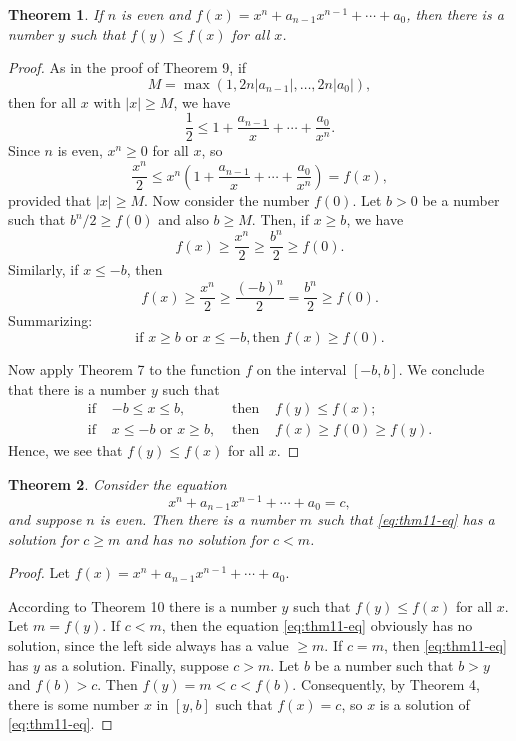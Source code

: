 \documentclass{article}
\numberwithin{definition}{subsection}
\numberwithin{lemma}{subsection}
\newtheorem{theorem}{Theorem}
\numberwithin{theorem}{subsection}
\begin{document}
\begin{theorem}
  If $n$ is even and $f(x) = x^n + a_{n-1}x^{n-1} + \cdots + a_0$, then there
  is a number $y$ such that $f(y) \leq f(x)$ for all $x$.
\end{theorem}
\begin{proof}
  As in the proof of Theorem 9, if \[
    M = \max(1, 2n|a_{n-1}|, \ldots, 2n|a_0|),
  \] then for all $x$ with $|x| \geq M$, we have \[
    \frac{1}{2} \leq 1 + \frac{a_{n-1}}{x} + \cdots + \frac{a_0}{x^n}.
    \] Since $n$ is even, $x^n \geq 0$ for all $x$, so \[
    \frac{x^n}{2}
    \leq x^n \left( 1 + \frac{a_{n-1}}{x} + \cdots + \frac{a_0}{x^n} \right)
    = f(x),
  \] provided that $|x| \geq M$. Now consider the number $f(0)$. Let $b > 0$ be
  a number such that $b^n/2 \geq f(0)$ and also $b \geq M$. Then, if $x \geq
  b$, we have \[
    f(x) \geq \frac{x^n}{2} \geq \frac{b^n}{2} \geq f(0).
  \] Similarly, if $x \leq -b$, then \[
    f(x) \geq \frac{x^n}{2} \geq \frac{(-b)^n}{2} = \frac{b^n}{2} \geq f(0).
  \] Summarizing: \[
    \text{if } x \geq b \text{ or } x \leq -b, \text{then } f(x) \geq f(0).
  \]

  Now apply Theorem 7 to the function $f$ on the interval $[-b, b]$. We
  conclude that there is a number $y$ such that \begin{align*}
    \text{if } &-b \leq x \leq b, &\text{ then } &f(y) \leq f(x); \\
    \text{if } &x \leq -b \text{ or } x \geq b, &\text{ then } &f(x) \geq f(0)
      \geq f(y).
  \end{align*}
  Hence, we see that $f(y) \leq f(x)$ for all $x$.
\end{proof}

\begin{theorem}
  Consider the equation \[
    \label{eq:thm11-eq} \tag{*}
    x^n + a_{n-1}x^{n-1} + \cdots + a_0 = c, 
  \] and suppose $n$ is even. Then there is a number $m$ such that
  \eqref{eq:thm11-eq} has a solution for $c \geq m$ and has no solution for $c
  < m$.
\end{theorem}
\begin{proof}
  Let $f(x) = x^n + a_{n-1}x^{n-1} + \cdots + a_0$.

  According to Theorem 10 there is a number $y$ such that $f(y) \leq f(x)$ for
  all $x$. Let $m = f(y)$. If $c < m$, then the equation \eqref{eq:thm11-eq}
  obviously has no solution, since the left side always has a value $\geq m$.
  If $c = m$, then \eqref{eq:thm11-eq} has $y$ as a solution. Finally,
  suppose $c > m$. Let $b$ be a number such that $b > y$ and $f(b) > c$. Then
  $f(y) = m < c < f(b)$. Consequently, by Theorem 4, there is some number $x$
  in $[y, b]$ such that $f(x) = c$, so $x$ is a solution of
  \eqref{eq:thm11-eq}.
\end{proof}
\end{document}
